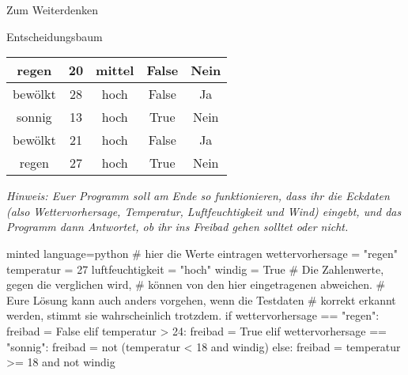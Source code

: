 \begin{task}[points=auto]{Zum Weiterdenken }
\begin{subtask*}[points=0]{Entscheidungsbaum}
\begin{table}[ht]
\begin{tabular}{|c|c|c|c|c|}
                regen            & 20         & mittel           & False & Nein    \\\hline
                bewölkt          & 28         & hoch             & False & Ja      \\\hline
                sonnig           & 13         & hoch             & True  & Nein    \\\hline
                bewölkt          & 21         & hoch             & False & Ja      \\\hline
                regen            & 27         & hoch             & True  & Nein    \\\hline
            \end{tabular}
        \end{table}

        \textit{Hinweis: Euer Programm soll am Ende so funktionieren, dass ihr die Eckdaten (also Wettervorhersage, Temperatur, Luftfeuchtigkeit und Wind) eingebt, und das Programm dann Antwortet, ob ihr ins Freibad gehen solltet oder nicht.}

        \begin{solution}
            \begin{codeBlock}[]{minted language=python}
                # hier die Werte eintragen
                wettervorhersage = "regen"
                temperatur = 27
                luftfeuchtigkeit = "hoch"
                windig = True
                # Die Zahlenwerte, gegen die verglichen wird,
                # können von den hier eingetragenen abweichen.
                # Eure Lösung kann auch anders vorgehen, wenn die Testdaten
                # korrekt erkannt werden, stimmt sie wahrscheinlich trotzdem.
                if wettervorhersage == "regen":
                    freibad = False
                elif temperatur > 24:
                    freibad = True
                elif wettervorhersage == "sonnig":
                    freibad = not (temperatur < 18 and windig)
                else:
                    freibad = temperatur >= 18 and not windig


\end{codeBlock}
\end{solution}
\end{subtask*}
\end{task}
